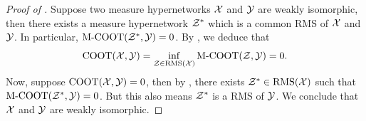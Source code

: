 \begin{proof}[Proof of ]
    Suppose two measure hypernetworks $\mathcal X$ and $\mathcal Y$ are weakly isomorphic,
    then there exists a measure hypernetwork $\mathcal Z^*$ which is a common RMS of $\mathcal X$ and $\mathcal Y$.
    In particular, $\text{M-COOT}(\mathcal Z^*, \mathcal Y) = 0$. By , we deduce that
    \begin{equation}
      \text{COOT}(\mathcal X, \mathcal Y) = \inf_{\mathcal Z \in \text{RMS}(\mathcal X)} \text{M-COOT}(\mathcal Z, \mathcal Y) = 0.
    \end{equation}
    Now, suppose $\text{COOT}(\mathcal X, \mathcal Y)=0$, then by ,
    there exists $\mathcal Z^* \in \text{RMS}(\mathcal X)$ such that $\text{M-COOT}(\mathcal Z^*, \mathcal Y) = 0$.
    But this also means $\mathcal Z^*$ is a RMS of $\mathcal Y$.
    We conclude that $\mathcal X$ and $\mathcal Y$ are weakly isomorphic.
\end{proof}


